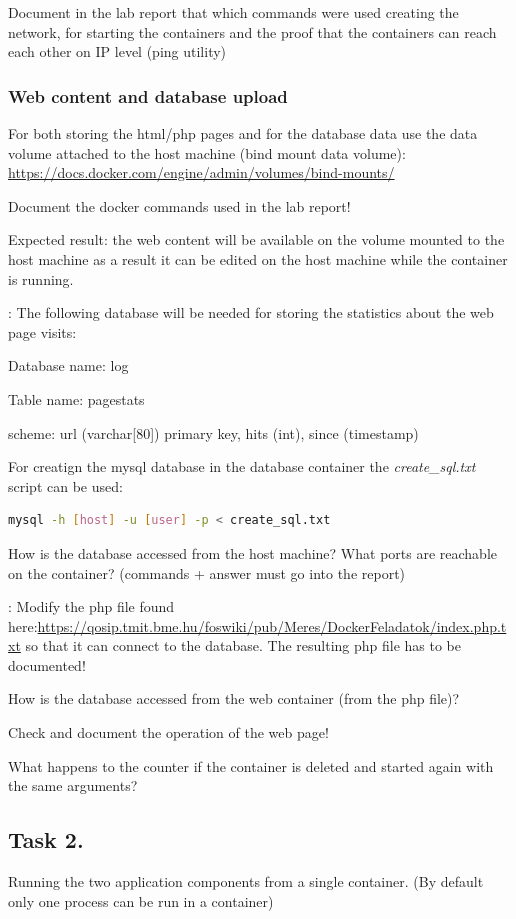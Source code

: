 \documentclass[a4paper]{article}
\begin{document}
Document in the lab report that which commands were used creating the network, for starting the containers and the
proof that the containers can reach each other on IP level (ping utility)

\subsubsection{Web content and database upload}

For both storing the html/php pages and for the database data use the data volume attached to the host machine (bind
mount data volume): \url{https://docs.docker.com/engine/admin/volumes/bind-mounts/}

Document the docker commands used in the lab report!

Expected result: the web content will be available on the volume mounted to the host machine as a result it can be
edited on the host machine while the container is running.

\textbf{\emph{}}: The following database will be needed for storing the statistics about the web page visits:

Database name: log

Table name: pagestats

scheme:  url (varchar[80]) primary key, hits (int), since (timestamp)

For creatign the mysql database in the database container the \emph{create\_sql.txt} script can be used:
\begin{lstlisting}[language=bash,breaklines]mysql -h [host] -u [user] -p < create_sql.txt
\end{lstlisting}

How is the database accessed from the host machine? What ports are reachable on the container? (commands + answer must
go into the report)

\textbf{\emph{}}:  Modify the php file found
here:\url{https://qosip.tmit.bme.hu/foswiki/pub/Meres/DockerFeladatok/index.php.txt} so that it can connect to the
database. The resulting php file has to be documented!

How is the database accessed from the web container (from the php file)?

Check and document the operation of the web page!

What happens to the counter if the container is deleted and started again with the same arguments?

\subsection{Task 2.}
Running the two application components from a single container. (By default only one process can be run in a container)
\end{document}
